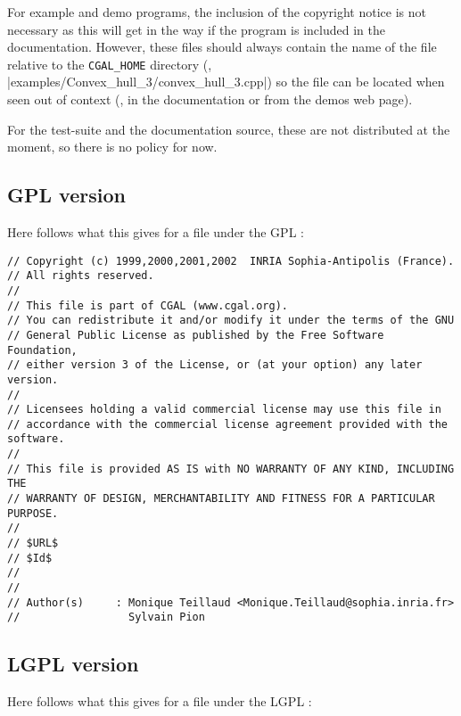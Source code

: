 For example and demo programs, the inclusion of the copyright notice is not
necessary as this will get in the way if the program is included in the
documentation.  However, these files should always contain the name of
the file relative to the \texttt{CGAL\_HOME} directory
(\eg, \nonlinkedpath|examples/Convex_hull_3/convex_hull_3.cpp|)
so the file can be located when seen out of context (\eg, in the documentation
or from the demos web page).

For the test-suite and the documentation source, these are not distributed at
the moment, so there is no policy for now.

\subsection*{GPL version}

Here follows what this gives for a file under the GPL :

\begin{verbatim}
// Copyright (c) 1999,2000,2001,2002  INRIA Sophia-Antipolis (France).
// All rights reserved.
//
// This file is part of CGAL (www.cgal.org).
// You can redistribute it and/or modify it under the terms of the GNU
// General Public License as published by the Free Software Foundation,
// either version 3 of the License, or (at your option) any later version.
//
// Licensees holding a valid commercial license may use this file in
// accordance with the commercial license agreement provided with the software.
//
// This file is provided AS IS with NO WARRANTY OF ANY KIND, INCLUDING THE
// WARRANTY OF DESIGN, MERCHANTABILITY AND FITNESS FOR A PARTICULAR PURPOSE.
//
// $URL$
// $Id$
// 
//
// Author(s)     : Monique Teillaud <Monique.Teillaud@sophia.inria.fr>
//                 Sylvain Pion
\end{verbatim}

\subsection*{LGPL version}

Here follows what this gives for a file under the LGPL :

